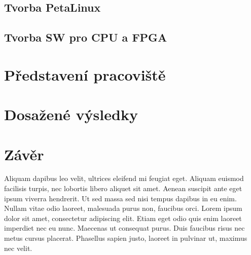 \documentclass[a4paper, twoside, 11pt]{article}
\begin{document}
	\subsection{Tvorba PetaLinux}
	\subsection{Tvorba SW pro CPU a FPGA}

\section{Představení pracoviště}
\section{Dosažené výsledky}


		
\newpage
{} 
\section*{Závěr}
Aliquam dapibus leo velit, ultrices eleifend mi feugiat eget. Aliquam euismod facilisis turpis, nec lobortis libero aliquet sit amet. Aenean suscipit ante eget ipsum viverra hendrerit. Ut sed massa sed nisi tempus dapibus in eu enim. Nullam vitae odio laoreet, malesuada purus non, faucibus orci. Lorem ipsum dolor sit amet, consectetur adipiscing elit. Etiam eget odio quis enim laoreet imperdiet nec eu nunc. Maecenas ut consequat purus. Duis faucibus risus nec metus cursus placerat. Phasellus sapien justo, laoreet in pulvinar ut, maximus nec velit.\par
	

\flushbottom %

\end{document}
